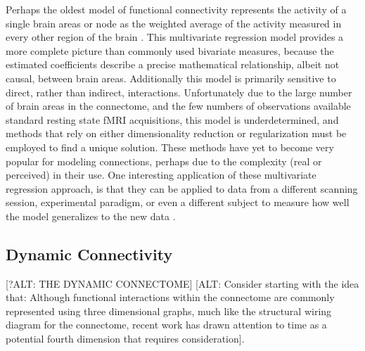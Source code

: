 Perhaps the oldest model of functional connectivity represents the activity of a single brain areas or node as the weighted average of the activity measured in every other region of the brain \cite{Firston, 1993}.  This multivariate regression model provides a more complete picture than commonly used bivariate measures, because the estimated  coefficients describe a precise mathematical relationship, albeit not causal, between brain areas. Additionally this model is primarily sensitive to direct, rather than indirect, interactions. Unfortunately due to the large number of brain areas in the connectome, and the  few numbers of observations available standard resting state fMRI acquisitions, this model is underdetermined, and methods that rely on either dimensionality reduction \cite{Friston1993} or regularization \cite{Gael, Craddock013, etc} must be employed to find a unique solution. These methods have yet to become very popular for modeling connections, perhaps due to the complexity (real or perceived) in their use. One interesting application of these multivariate regression approach, is that they can be applied to data from a different scanning session, experimental paradigm, or even a different subject to measure how well the model generalizes to the new data \cite{Craddock2013}. 

\subsection{Dynamic Connectivity} [?ALT: THE DYNAMIC CONNECTOME]
[ALT: Consider starting with the idea that: Although functional interactions within the connectome are commonly represented using three dimensional graphs, much like the structural wiring diagram for the connectome, recent work has drawn attention to time as a potential fourth dimension that requires consideration].

